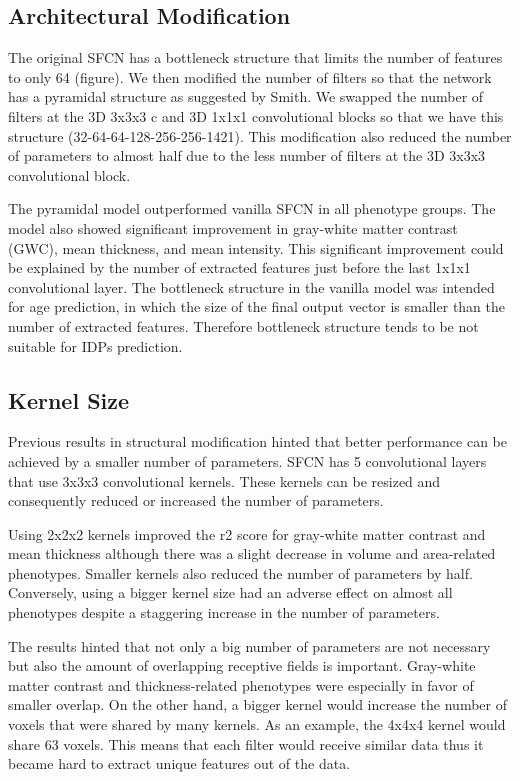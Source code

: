 \documentclass{article}
\begin{document}
    \subsection*{Architectural Modification}
    The original SFCN has a bottleneck structure that limits the number of features to only 64 (figure). 
    We then modified the number of filters so that the network has a pyramidal structure as suggested by Smith\cite*[]{smith}.  
    We swapped the number of filters at the 3D 3x3x3 c and 3D 1x1x1 convolutional blocks so that we have this structure (32-64-64-128-256-256-1421). 
    This modification also reduced the number of parameters to almost half due to the less number of filters at the 3D 3x3x3 convolutional block.

    The pyramidal model outperformed vanilla SFCN in all phenotype groups. 
    The model also showed significant improvement in gray-white matter contrast (GWC), mean thickness, and mean intensity. 
    This significant improvement could be explained by the number of extracted features just before the last 1x1x1 convolutional layer. 
    The bottleneck structure in the vanilla model was intended for age prediction, in which the size of the final output vector is smaller than the number of extracted features. 
    Therefore bottleneck structure tends to be not suitable for IDPs prediction.

    \subsection*{Kernel Size}
    Previous results in structural modification hinted that better performance can be achieved by a smaller number of parameters. 
    SFCN has 5 convolutional layers that use 3x3x3 convolutional kernels. These kernels can be resized and consequently reduced or increased the number of parameters. 

    Using 2x2x2 kernels improved the r2 score for gray-white matter contrast and mean thickness although there was a slight decrease in volume and area-related phenotypes. 
    Smaller kernels also reduced the number of parameters by half.  
    Conversely, using a bigger kernel size had an adverse effect on almost all phenotypes despite a staggering increase in the number of parameters.

    The results hinted that not only a big number of parameters are not necessary but also the amount of overlapping receptive fields is important. 
    Gray-white matter contrast and thickness-related phenotypes were especially in favor of smaller overlap. 
    On the other hand, a bigger kernel would increase the number of voxels that were shared by many kernels. 
    As an example, the 4x4x4 kernel would share 63 voxels. 
    This means that each filter would receive similar data thus it became hard to extract unique features out of the data.
\end{document}
